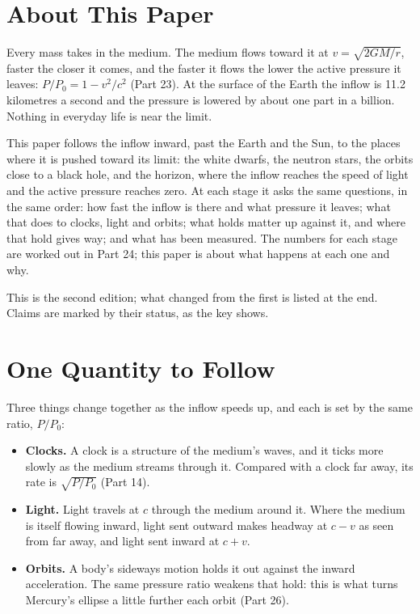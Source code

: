 \newcommand{\gptpart}{25}
\newcommand{\gpttitle}{The Medium at Its Limits}
\newcommand{\gptsubtitle}{Following the Inflow to the Speed of Light}
\newcommand{\gptdate}{November 2026}

\graphicspath{{figs/}}

\gptitle

\section*{About This Paper}

Every mass takes in the medium. The medium flows toward it at $v=\sqrt{2GM/r}$, faster the closer it comes, and the faster it flows the lower the active pressure it leaves: $P/P_0 = 1 - v^2/c^2$ (Part 23). At the surface of the Earth the inflow is 11.2 kilometres a second and the pressure is lowered by about one part in a billion. Nothing in everyday life is near the limit.

This paper follows the inflow inward, past the Earth and the Sun, to the places where it is pushed toward its limit: the white dwarfs, the neutron stars, the orbits close to a black hole, and the horizon, where the inflow reaches the speed of light and the active pressure reaches zero. At each stage it asks the same questions, in the same order: how fast the inflow is there and what pressure it leaves; what that does to clocks, light and orbits; what holds matter up against it, and where that hold gives way; and what has been measured. The numbers for each stage are worked out in Part 24; this paper is about what happens at each one and why.

This is the second edition; what changed from the first is listed at the end. Claims are marked by their status, as the key shows.

\statuskey

\section{One Quantity to Follow}

Three things change together as the inflow speeds up, and each is set by the same ratio, $P/P_0$:
\begin{itemize}
\item \textbf{Clocks.} A clock is a structure of the medium's waves, and it ticks more slowly as the medium streams through it. Compared with a clock far away, its rate is $\sqrt{P/P_0}$ (Part 14).
\item \textbf{Light.} Light travels at $c$ through the medium around it. Where the medium is itself flowing inward, light sent outward makes headway at $c-v$ as seen from far away, and light sent inward at $c+v$.
\item \textbf{Orbits.} A body's sideways motion holds it out against the inward acceleration. The same pressure ratio weakens that hold: this is what turns Mercury's ellipse a little further each orbit (Part 26).
\end{itemize}

